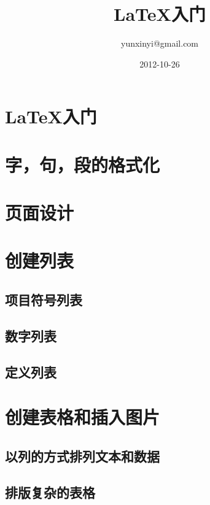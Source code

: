 \documentclass{book}
\title{LaTeX入门}
\author{yunxinyi@gmail.com}
\date{2012-10-26}
\begin{document}
	\maketitle
	\tableofcontents
	\chapter{LaTeX入门}
		
		
		
		
		
	\chapter{字，句，段的格式化}
		
		
		
		
		
		
		
		
		
		
		
	\chapter{页面设计}
		
		
		
\chapter{创建列表}
	\section{项目符号列表}
	\section{数字列表}
	\section{定义列表}
\chapter{创建表格和插入图片}
	\section{以列的方式排列文本和数据}
	\section{排版复杂的表格}
\end{document}
